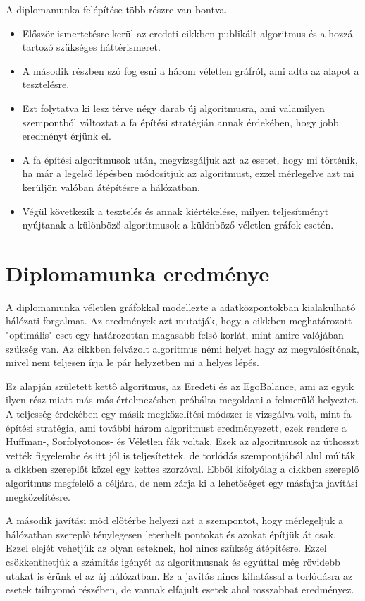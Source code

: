 \documentclass[12pt]{report}
\begin{document}
A diplomamunka felépítése több részre van bontva.
\begin{itemize}
	\item Először ismertetésre kerül az eredeti cikkben \cite{avin_demand-aware_nodate} publikált algoritmus és a hozzá tartozó szükséges háttérismeret.
	\item A második részben szó fog esni a három véletlen gráfról, ami adta az alapot a tesztelésre.
	\item Ezt folytatva ki lesz térve négy darab új algoritmusra, ami valamilyen szempontból változtat a fa építési stratégián annak érdekében, hogy jobb eredményt érjünk el.
	\item A fa építési algoritmusok után, megvizsgáljuk azt az esetet, hogy mi történik, ha már a legelső lépésben módosítjuk az algoritmust, ezzel mérlegelve azt mi kerüljön valóban átépítésre a hálózatban.
	\item Végül következik a tesztelés és annak kiértékelése, milyen teljesítményt nyújtanak a különböző algoritmusok a különböző véletlen gráfok esetén. 
\end{itemize}


\section{Diplomamunka eredménye}

A diplomamunka véletlen gráfokkal modellezte a adatközpontokban kialakulható hálózati forgalmat.
Az eredmények azt mutatják, hogy a cikkben meghatározott "optimális" eset egy határozottan magasabb felső korlát, mint amire valójában szükség van.
Az cikkben felvázolt algoritmus némi helyet hagy az megvalósítónak, mivel nem teljesen írja le pár helyzetben mi a helyes lépés.

Ez alapján született kettő algoritmus, az Eredeti és az EgoBalance, ami az egyik ilyen rész miatt más-más értelmezésben próbálta megoldani a felmerülő helyeztet.
A teljesség érdekében egy másik megközelítési módszer is vizsgálva volt, mint fa építési stratégia, ami további három algoritmust eredményezett, ezek rendere a Huffman-, Sorfolyotonos- és Véletlen fák voltak.
Ezek az algoritmusok az úthosszt vették figyelembe és itt jól is teljesítettek, de torlódás szempontjából alul múlták a cikkben szereplőt közel egy kettes szorzóval.
Ebből kifolyólag a cikkben szereplő algoritmus megfelelő a céljára, de nem zárja ki a lehetőséget egy másfajta javítási megközelítésre. 

A második javítási mód előtérbe helyezi azt a szempontot, hogy mérlegeljük a hálózatban szereplő ténylegesen leterhelt pontokat és azokat építjük át csak.
Ezzel elejét vehetjük az olyan esteknek, hol nincs szükség átépítésre.
Ezzel csökkenthetjük a számítás igényét az algoritmusnak és egyúttal még rövidebb utakat is érünk el az új hálózatban.
Ez a javítás nincs kihatással a torlódásra az esetek túlnyomó részében, de vannak elfajult esetek ahol rosszabbat eredményez.
\end{document}
